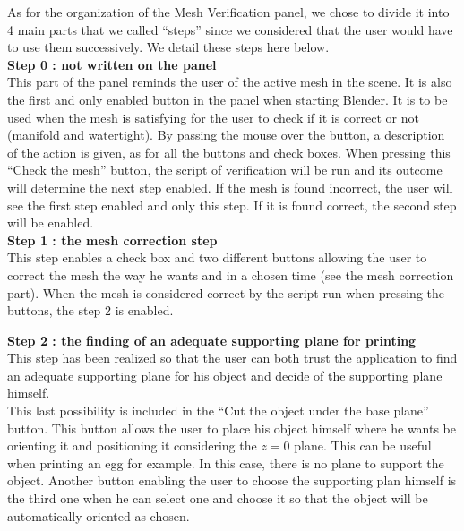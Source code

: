 \documentclass{report}
\begin{document}
As for the organization of the Mesh Verification panel, we chose to divide it into 4 main parts that we called ``steps'' since we considered that the user would have to use them successively. We detail these steps here below.\\

\textbf{Step 0 : not written on the panel} \\

This part of the panel reminds the user of the active mesh in the scene. It is also the first and only enabled button in the panel when starting Blender. It is to be used when the mesh is satisfying for the user to check if it is correct or not (manifold and watertight). By passing the mouse over the button, a description of the action is given, as for all the buttons and check boxes. When pressing this ``Check the mesh'' button, the script of verification will be run and its outcome will determine the next step enabled. If the mesh is found incorrect, the user will see the first step enabled and only this step. If it is found correct, the second step will be enabled.\\

\textbf{Step 1 : the mesh correction step} \\

This step enables a check box and two different buttons allowing the user to correct the mesh the way he wants and in a chosen time (see the mesh correction part). When the mesh is considered correct by the script run when pressing the buttons, the step 2 is enabled.

\textbf{Step 2 : the finding of an adequate supporting plane for printing}\\

This step has been realized so that the user can both trust the application to find an adequate supporting plane for his object and decide of the supporting plane himself. \\

This last possibility is included in the ``Cut the object under the base plane'' button. This button allows the user to place his object himself where he wants be orienting it and positioning it considering the $z = 0$ plane. This can be useful when printing an egg for example. In this case, there is no plane to support the object. Another button enabling the user to choose the supporting plan himself is the third one when he can select one and choose it so that the object will be automatically oriented as chosen.\\
\end{document}
